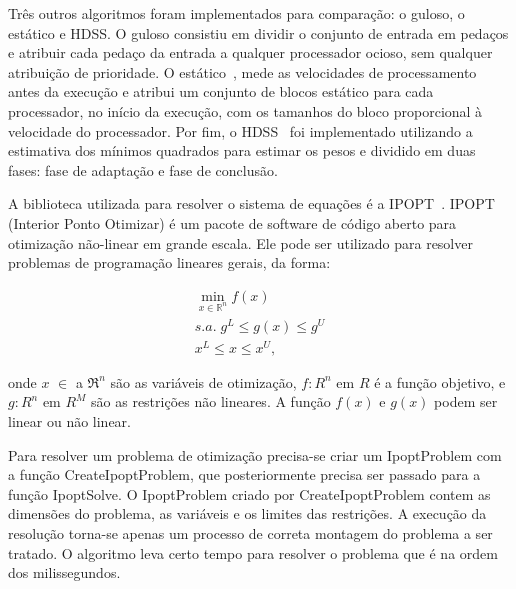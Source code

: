 Três outros algoritmos foram implementados para comparação: o guloso, o estático e 
HDSS. O guloso consistiu em dividir o conjunto de entrada em pedaços e atribuir 
cada pedaço da entrada a qualquer processador ocioso, sem qualquer atribuição de prioridade. O estático~\cite{raphael}, mede as velocidades de processamento antes da execução e  atribui um conjunto  de blocos estático para cada processador, no início da execução, com os
tamanhos do bloco proporcional à velocidade do processador. Por fim, o HDSS~\cite{HDSS}  
foi implementado utilizando a estimativa dos mínimos quadrados para estimar os pesos e 
dividido em duas fases: fase de adaptação e fase de conclusão. 

A biblioteca utilizada para resolver o sistema de equações é a IPOPT~\cite{point}. IPOPT (Interior Ponto Otimizar) é um pacote de software de código aberto para otimização não-linear em grande escala. Ele pode ser utilizado para resolver problemas de programação lineares gerais, da forma:

\begin{eqnarray}
\displaystyle \min_{x\in\mathbb{R}^n} 
	\displaystyle f(x) \\
	s.a.\displaystyle \;  \nonumber 
	 	\displaystyle g^L \leq g(x) \leq g^U  \nonumber \\	
 	 	\displaystyle x^L \leq x \leq x^U, \nonumber 
\end{eqnarray}

onde $x$ $\in$ a $\Re ^ n$ são as variáveis de otimização, $f : R^n$ em $R$ é a função objetivo, e $g: R^n$ em $R^M$ são as restrições não lineares. A função $f(x)$ e $g(x)$ podem ser linear ou não linear.  

Para resolver um problema de otimização precisa-se criar um IpoptProblem com a função CreateIpoptProblem, que posteriormente precisa ser passado para a função IpoptSolve. O IpoptProblem criado por CreateIpoptProblem contem as dimensões do problema, as variáveis e os limites das restrições. A execução da resolução torna-se apenas um processo de correta montagem do problema a ser tratado. O algoritmo leva certo tempo para resolver o problema que é na ordem dos milissegundos. 


